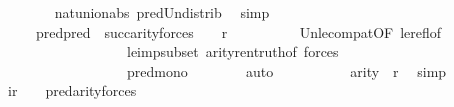 \begin{isabellebody}
\ \ \ \ \ \ \isamarkupfalse%
\ nat{\isacharunderscore}{\kern0pt}union{\isacharunderscore}{\kern0pt}abs{}\ pred{\isacharunderscore}{\kern0pt}Un{\isacharunderscore}{\kern0pt}distrib\ \isamarkupfalse%
\ simp\isanewline
\ \ \ \ \isamarkupfalse%
\isanewline
\ \ \ \ \isamarkupfalse%
\ {\isachardoublequoteopen}{\isachardot}{\kern0pt}{\isachardot}{\kern0pt}{\isachardot}{\kern0pt}\ {\isasymle}\ {}\ {\isasymunion}\ {\isacharparenleft}{\kern0pt}pred{\isacharparenleft}{\kern0pt}pred{\isacharparenleft}{\kern0pt}{}\ {\isasymunion}\ succ{\isacharparenleft}{\kern0pt}arity{\isacharparenleft}{\kern0pt}forces{\isacharparenleft}{\kern0pt}{\isasymphi}{\isacharparenright}{\kern0pt}{\isacharparenright}{\kern0pt}{\isacharparenright}{\kern0pt}{\isacharparenright}{\kern0pt}{\isacharparenright}{\kern0pt}{\isacharparenright}{\kern0pt}{\isachardoublequoteclose}\ {\isacharparenleft}{\kern0pt}\ {\isachardoublequoteopen}{\isacharunderscore}{\kern0pt}\ {\isasymle}\ {\isacharquery}{\kern0pt}r{\isachardoublequoteclose}{\isacharparenright}{\kern0pt}\isanewline
\ \ \ \ \ \ \isamarkupfalse%
\ \ {\isacartoucheopen}{\isasymphi}{\isasymin}{\isacharunderscore}{\kern0pt}{\isacartoucheclose}\ Un{\isacharunderscore}{\kern0pt}le{\isacharunderscore}{\kern0pt}compat{\isacharbrackleft}{\kern0pt}OF\ le{\isacharunderscore}{\kern0pt}refl{\isacharbrackleft}{\kern0pt}of\ {}{\isacharbrackright}{\kern0pt}{\isacharbrackright}{\kern0pt}\ \isanewline
\ \ \ \ \ \ \ \ \ \ \ \ \ \ \ \ \ \ le{\isacharunderscore}{\kern0pt}imp{\isacharunderscore}{\kern0pt}subset\ arity{\isacharunderscore}{\kern0pt}ren{\isacharunderscore}{\kern0pt}truth{\isacharbrackleft}{\kern0pt}of\ {\isachardoublequoteopen}forces{\isacharparenleft}{\kern0pt}{\isasymphi}{\isacharparenright}{\kern0pt}{\isachardoublequoteclose}{\isacharbrackright}{\kern0pt}\isanewline
\ \ \ \ \ \ \ \ \ \ \ \ \ \ \ \ \ \ pred{\isacharunderscore}{\kern0pt}mono\isanewline
\ \ \ \ \ \ \isamarkupfalse%
\ auto\isanewline
\ \ \ \ \isamarkupfalse%
\isanewline
\ \ \ \ \isamarkupfalse%
\ {\isachardoublequoteopen}arity{\isacharparenleft}{\kern0pt}{\isacharquery}{\kern0pt}{\isasympsi}{\isacharparenright}{\kern0pt}\ {\isasymle}\ {\isacharquery}{\kern0pt}r{\isachardoublequoteclose}\ \isamarkupfalse%
\ simp\isanewline
\ \ \ \ \isamarkupfalse%
\ i{\isacharcolon}{\kern0pt}{\isachardoublequoteopen}{\isacharquery}{\kern0pt}r\ {\isasymle}\ {}\ {\isasymunion}\ pred{\isacharparenleft}{\kern0pt}arity{\isacharparenleft}{\kern0pt}forces{\isacharparenleft}{\kern0pt}{\isasymphi}{\isacharparenright}{\kern0pt}{\isacharparenright}{\kern0pt}{\isacharparenright}{\kern0pt}{\isachardoublequoteclose}\ \isanewline

\end{isabellebody}
